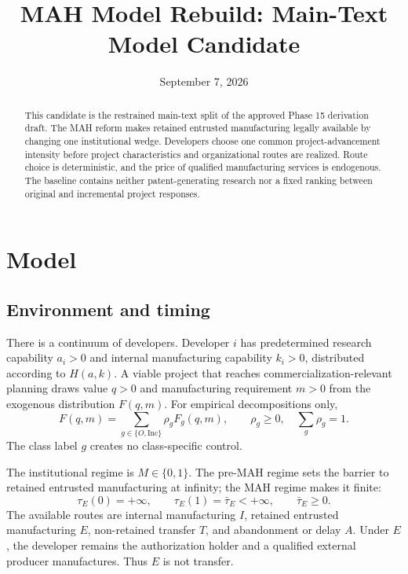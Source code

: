 \documentclass[11pt]{article}
\title{MAH Model Rebuild: Main-Text Model Candidate}
\author{}
\date{September 7, 2026}
\begin{document}
\maketitle

\begin{abstract}
This candidate is the restrained main-text split of the approved Phase 15
derivation draft. The MAH reform makes retained entrusted manufacturing
legally available by changing one institutional wedge. Developers choose one
common project-advancement intensity before project characteristics and
organizational routes are realized. Route choice is deterministic, and the
price of qualified manufacturing services is endogenous. The baseline
contains neither patent-generating research nor a fixed ranking between
original and incremental project responses.
\end{abstract}

\setcounter{section}{2}
\section{Model}
\label{sec:p16m-model}

\subsection{Environment and timing}
\label{subsec:p16m-environment}

There is a continuum of developers. Developer \(i\) has predetermined
research capability \(a_i>0\) and internal manufacturing capability
\(k_i>0\), distributed according to \(H(a,k)\). A viable project that reaches
commercialization-relevant planning draws value \(q>0\) and manufacturing
requirement \(m>0\) from the exogenous distribution \(F(q,m)\). For empirical
decompositions only,
\[
  F(q,m)=\sum_{g\in\{O,\mathrm{Inc}\}}\rho_gF_g(q,m),
  \qquad
  \rho_g\geq0,\quad \sum_g\rho_g=1.
\]
The class label \(g\) creates no class-specific control.

The institutional regime is \(M\in\{0,1\}\). The pre-MAH regime sets the
barrier to retained entrusted manufacturing at infinity; the MAH regime
makes it finite:
\begin{equation}
  \tau_E(0)=+\infty,
  \qquad
  \tau_E(1)=\bar\tau_E<+\infty,
  \qquad \bar\tau_E\geq0.
  \label{eq:p16m-policy}
\end{equation}
The available routes are internal manufacturing \(I\), retained entrusted
manufacturing \(E\), non-retained transfer \(T\), and abandonment or delay
\(A\). Under \(E\), the developer remains the authorization holder and a
qualified external producer manufactures. Thus \(E\) is not transfer.
\end{document}
